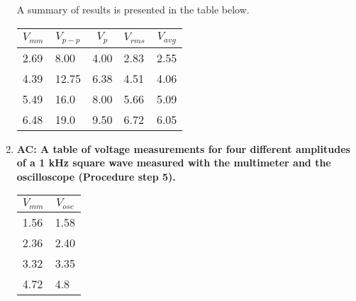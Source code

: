\begin{enumerate}[resume]
A summary of results is presented in the table below.

\begin{table}[ht]
\center
\begin{tabular}{|l|l|l|l|l|}
\hline
\multicolumn{1}{|c|}{$V_{mm}$} & \multicolumn{1}{c|}{$V_{p-p}$} & \multicolumn{1}{c|}{$V_p$} & \multicolumn{1}{c|}{$V_{rms}$} & \multicolumn{1}{c|}{$V_{avg}$} \\ \hline
2.69                           & 8.00                           & 4.00                       & 2.83                           & 2.55                           \\ \hline
4.39                           & 12.75                          & 6.38                       & 4.51                           & 4.06                           \\ \hline
5.49                           & 16.0                           & 8.00                       & 5.66                           & 5.09                           \\ \hline
6.48                           & 19.0                           & 9.50                       & 6.72                           & 6.05                           \\ \hline
\end{tabular}
\label{tab:accg5}
\end{table}

\item {\bf AC: A table of voltage measurements for four different amplitudes of a 1 kHz square wave measured with the multimeter and the oscilloscope (Procedure step 5).}\newline

\begin{table}[ht]
\center
\begin{tabular}{|l|l|}
\hline
\multicolumn{1}{|c|}{$V_{mm}$} & \multicolumn{1}{c|}{$V_{osc}$} \\ \hline
1.56                           & 1.58                           \\ \hline
2.36                           & 2.40                           \\ \hline
3.32                           & 3.35                           \\ \hline
4.72                           & 4.8                            \\ \hline
\end{tabular}
\label{tab:accg6}
\end{table}


\end{enumerate}
